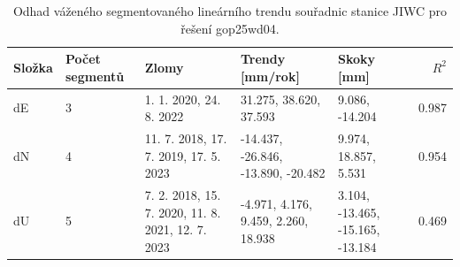 \begin{table}[htbp]
\caption{Odhad váženého segmentovaného lineárního trendu souřadnic stanice JIWC pro řešení gop25wd04.}
\label{tab:gop25wd04_stcd_jiwc_weighted_multiseg}
\begin{tabular}{lllllr}
\toprule
Složka & Počet segmentů & Zlomy & Trendy [mm/rok] & Skoky [mm] & $R^2$ \\
\midrule
dE & 3 & 1. 1. 2020, 24. 8. 2022 & 31.275, 38.620, 37.593 & 9.086, -14.204 & 0.987 \\
dN & 4 & 11. 7. 2018, 17. 7. 2019, 17. 5. 2023 & -14.437, -26.846, -13.890, -20.482 & 9.974, 18.857, 5.531 & 0.954 \\
dU & 5 & 7. 2. 2018, 15. 7. 2020, 11. 8. 2021, 12. 7. 2023 & -4.971, 4.176, 9.459, 2.260, 18.938 & 3.104, -13.465, -15.165, -13.184 & 0.469 \\
\bottomrule
\end{tabular}
\end{table}
